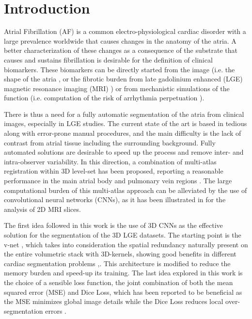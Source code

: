 \documentclass{llncs}
\begin{document}
\section{Introduction}

Atrial Fibrillation (AF) is a common electro-physiological cardiac disorder with a large prevalence worldwide \cite{Prystowsky} that causes changes in the anatomy of the atria. A better characterization of these changes as a consequence of the substrate that causes and sustains fibrillation is desirable for the definition of clinical biomarkers. These biomarkers can be directly started from the image (i.e. the shape of the atria \cite{Varela17}, or the fibrotic burden from late gadolinium enhanced (LGE) magnetic resonance imaging (MRI) \cite{Kim}) or from mechanistic simulations of the function (i.e. computation of the risk of arrhythmia perpetuation \cite{Boyle16}). 

There is thus a need for a fully automatic segmentation of the atria from clinical images, especially in LGE studies. The current state of the art is based in tedious along with error-prone manual procedures, and the main difficulty is the lack of contrast from atrial tissue including the surrounding background. Fully automated solutions are desirable to speed up the process and remove inter- and intra-observer variability. In this direction, a combination of multi-atlas registration within 3D level-set has been proposed, reporting a reasonable performance in the main atrial body and pulmonary vein regions \cite{Tao}. The large computational burden of this multi-atlas approach can be alleviated by the use of convolutional neural networks (CNNs), as it has been illustrated in \cite{Aliasghar} for the analysis of 2D MRI slices. 

The first idea followed in this work is the use of 3D CNNs as the effective solution for the segmentation of the 3D LGE datasets. The starting point is the v-net \cite{Fausto}, which takes into consideration the spatial redundancy naturally present on the entire volumetric stack with 3D-kernels, showing good benefits in different cardiac segmentation problems \cite{Isensee},\cite{Hinrich}. This architecture is modified to reduce the memory burden and speed-up its training. The last idea explored in this work is the choice of a sensible loss function, the joint combination of both the mean squared error (MSE) and Dice Loss, which has been reported to be beneficial as the MSE minimizes global image details while the Dice Loss reduces local over-segmentation errors \cite{Fausto}.
\end{document}
